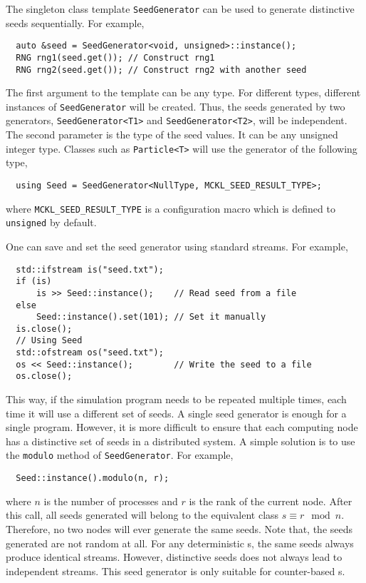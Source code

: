 The singleton class template \verb|SeedGenerator| can be used to generate
distinctive seeds sequentially. For example,
\begin{Verbatim}
  auto &seed = SeedGenerator<void, unsigned>::instance();
  RNG rng1(seed.get()); // Construct rng1
  RNG rng2(seed.get()); // Construct rng2 with another seed
\end{Verbatim}
The first argument to the template can be any type. For different types,
different instances of \verb|SeedGenerator| will be created. Thus, the seeds
generated by two generators, \verb|SeedGenerator<T1>| and
\verb|SeedGenerator<T2>|, will be independent. The second parameter is the type
of the seed values. It can be any unsigned integer type. Classes such as
\verb|Particle<T>| will use the generator of the following type,
\begin{Verbatim}
  using Seed = SeedGenerator<NullType, MCKL_SEED_RESULT_TYPE>;
\end{Verbatim}
where \verb|MCKL_SEED_RESULT_TYPE| is a configuration macro which is defined to
\verb|unsigned| by default.

One can save and set the seed generator using standard \cpp streams. For
example,
\begin{Verbatim}
  std::ifstream is("seed.txt");
  if (is)
      is >> Seed::instance();    // Read seed from a file
  else
      Seed::instance().set(101); // Set it manually
  is.close();
  // Using Seed
  std::ofstream os("seed.txt");
  os << Seed::instance();        // Write the seed to a file
  os.close();
\end{Verbatim}
This way, if the simulation program needs to be repeated multiple times, each
time it will use a different set of seeds. A single seed generator is enough
for a single program. However, it is more difficult to ensure that each
computing node has a distinctive set of seeds in a distributed system. A simple
solution is to use the \verb|modulo| method of \verb|SeedGenerator|. For
example,
\begin{Verbatim}
  Seed::instance().modulo(n, r);
\end{Verbatim}
where $n$ is the number of processes and $r$ is the rank of the current node.
After this call, all seeds generated will belong to the equivalent class $s
\equiv r \mod n$. Therefore, no two nodes will ever generate the same seeds.
Note that, the seeds generated are not random at all. For any deterministic
\rng{}s, the same seeds always produce identical streams. However, distinctive
seeds does not always lead to independent streams. This seed generator is only
suitable for counter-based \rng{}s.

